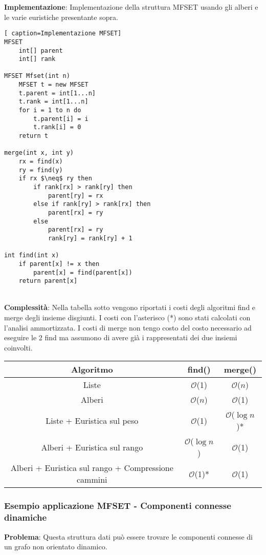\documentclass[../cheatSheetAlgoritmi.tex]{subfiles}
\begin{document}
\bigskip

\textbf{Implementazione}: Implementazione della struttura MFSET usando gli alberi e le varie euristiche presentante sopra.
\begin{lstlisting}[ caption=Implementazione MFSET]
MFSET
	int[] parent
	int[] rank
	
MFSET Mfset(int n)
	MFSET t = new MFSET
	t.parent = int[1...n]
	t.rank = int[1...n]
	for i = 1 to n do
		t.parent[i] = i
		t.rank[i] = 0
	return t
	
merge(int x, int y)
	rx = find(x)
	ry = find(y)
	if rx $\neq$ ry then
		if rank[rx] > rank[ry] then
			parent[ry] = rx
		else if rank[ry] > rank[rx] then
			parent[rx] = ry
		else
			parent[rx] = ry
			rank[ry] = rank[ry] + 1

int find(int x)
	if parent[x] != x then
		parent[x] = find(parent[x])
	return parent[x]
\end{lstlisting}
\textbf{\\Complessità}: Nella tabella sotto vengono riportati i costi degli algoritmi find e merge degli insieme disgiunti. I costi con l'asterisco (*) sono stati calcolati con l'analisi ammortizzata. I costi di merge non tengo costo del costo necessario ad eseguire le 2 find ma assumono di avere già i rappresentati dei due insiemi coinvolti.

\begin{center}
	\renewcommand{\arraystretch}{1.2}
	\begin{tabular}{ |c|c|c| } 
		\hline
			\textbf{Algoritmo} & find() & merge()\\ 
		\hline
			Liste & $\mathcal{O}$(1) &  $\mathcal{O}$($n$)\\ 
		\hline
			Alberi &  $\mathcal{O}$($n$) &  $\mathcal{O}$(1) \\
		\hline
			Liste + Euristica sul peso & $\mathcal{O}$(1) &  $\mathcal{O}$($\log n$)*\\
		\hline
			Alberi + Euristica sul rango & $\mathcal{O}$($\log n$) &  $\mathcal{O}$(1)\\
		\hline
			Alberi + Euristica sul rango + Compressione cammini & $\mathcal{O}$(1)* &  $\mathcal{O}$(1)\\
		\hline
	\end{tabular}
\end{center}
\newpage
\subsubsection{Esempio applicazione MFSET - Componenti connesse dinamiche}
\textbf{Problema}: Questa struttura dati può essere trovare le componenti connesse di un grafo non orientato dinamico.
\end{document}
